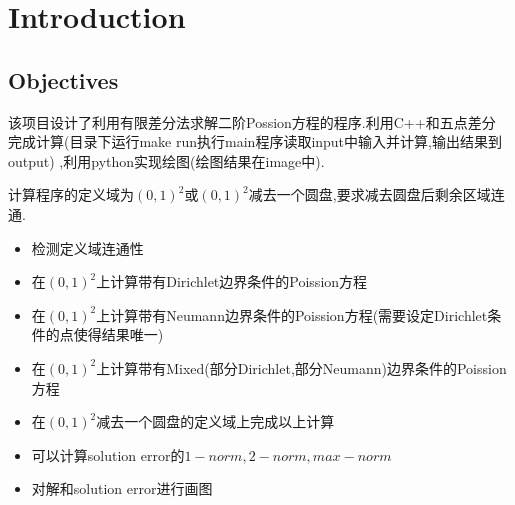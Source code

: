 \chapter{Introduction}
\label{ch:introduction}




\section{Objectives}

该项目设计了利用有限差分法求解二阶Possion方程的程序.利用C++和五点差分
完成计算(目录下运行make run执行main程序读取input中输入并计算,输出结果到output)
,利用python实现绘图(绘图结果在image中).

计算程序的定义域为$(0,1)^2$或$(0,1)^2$减去一个圆盘,要求减去圆盘后剩余区域连通.

\begin{itemize}
    \item 检测定义域连通性
    \item 在$(0,1)^2$上计算带有Dirichlet边界条件的Poission方程
    \item 在$(0,1)^2$上计算带有Neumann边界条件的Poission方程(需要设定Dirichlet条件的点使得结果唯一)
    \item 在$(0,1)^2$上计算带有Mixed(部分Dirichlet,部分Neumann)边界条件的Poission方程
    \item 在$(0,1)^2$减去一个圆盘的定义域上完成以上计算
    \item 可以计算solution error的$1-norm,2-norm,max-norm$
    \item 对解和solution error进行画图
\end{itemize}